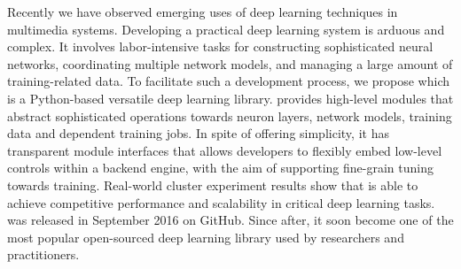 Recently we have observed emerging uses of deep learning techniques
in multimedia systems.
Developing a practical deep learning system is arduous and complex.
It involves labor-intensive tasks for constructing sophisticated neural networks, 
coordinating multiple network models, and managing a large amount of training-related data. 
To facilitate such a development process, we propose
\tl which is a Python-based versatile deep learning library.
\tl provides high-level modules that abstract sophisticated operations towards 
neuron layers, network models, 
training data and dependent training jobs. In spite of offering simplicity, 
it has transparent module interfaces that allows 
developers to flexibly embed low-level controls within a backend engine,
with the aim of supporting fine-grain tuning towards training.
Real-world cluster experiment results show that \tl is able to achieve competitive performance and scalability
in critical deep learning tasks.
\tl was released in September 2016 on GitHub. Since after, it soon become one of the most popular
open-sourced deep learning library used by researchers and practitioners. 


